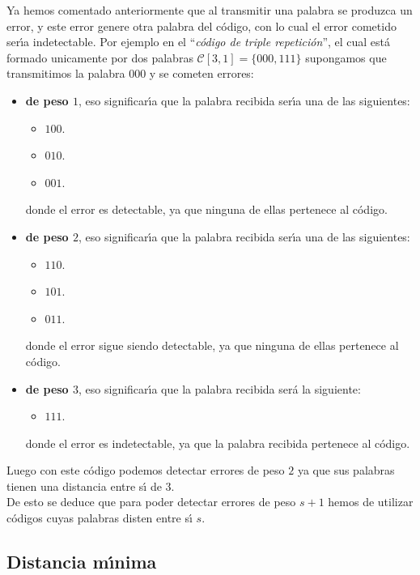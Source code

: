 Ya hemos comentado anteriormente que al transmitir una palabra se produzca un
error, y este error genere otra palabra del c\'odigo, con lo cual el error
cometido ser\'{\i}a indetectable. Por ejemplo en el ``\emph{c\'odigo de triple
repetici\'on}'', el cual est\'a formado unicamente por dos palabras
$\mathcal{C}[3,1]=\{000,111\}$ supongamos que transmitimos la palabra $000$ y se
cometen errores:
\begin{itemize}
\item \textbf{de peso $1$}, eso significar\'{\i}a que la palabra recibida
ser\'{\i}a una de las siguientes:
\begin{itemize}
\item $100$.
\item $010$.
\item $001$.
\end{itemize}
donde el error es detectable, ya que ninguna de ellas pertenece al c\'odigo.
%
\newpage
%
\item \textbf{de peso $2$}, eso significar\'{\i}a que la palabra recibida
ser\'{\i}a una de las siguientes:
\begin{itemize}
\item $110$.
\item $101$.
\item $011$.
\end{itemize}
donde el error sigue siendo detectable, ya que ninguna de ellas pertenece al
c\'odigo. 
\item \textbf{de peso $3$}, eso significar\'{\i}a que la palabra recibida
ser\'a la siguiente:
\begin{itemize}
\item $111$.
\end{itemize}
donde el error es indetectable, ya que la palabra recibida pertenece al
c\'odigo.
\end{itemize}
Luego con este c\'odigo podemos detectar errores de peso $2$ ya que sus palabras
tienen una distancia entre s\'{\i} de $3$.\\

De esto se deduce que para poder detectar errores de peso $s+1$ hemos de 
utilizar c\'odigos cuyas palabras disten entre s\'{\i} $s$.

\subsection{Distancia m\'{\i}nima}


